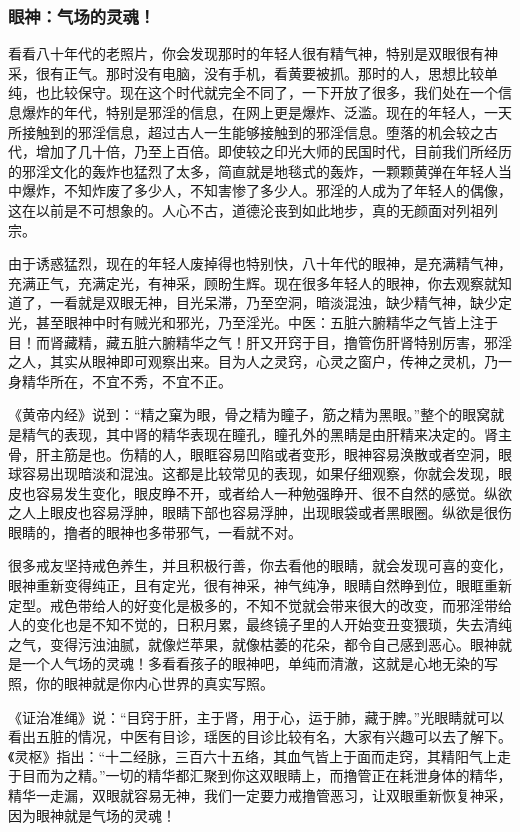 \subsubsection{眼神：气场的灵魂！}

看看八十年代的老照片，你会发现那时的年轻人很有精气神，特别是双眼很有神采，很有正气。那时没有电脑，没有手机，看黄要被抓。那时的人，思想比较单纯，也比较保守。现在这个时代就完全不同了，一下开放了很多，我们处在一个信息爆炸的年代，特别是邪淫的信息，在网上更是爆炸、泛滥。现在的年轻人，一天所接触到的邪淫信息，超过古人一生能够接触到的邪淫信息。堕落的机会较之古代，增加了几十倍，乃至上百倍。即使较之印光大师的民国时代，目前我们所经历的邪淫文化的轰炸也猛烈了太多，简直就是地毯式的轰炸，一颗颗黄弹在年轻人当中爆炸，不知炸废了多少人，不知害惨了多少人。邪淫的人成为了年轻人的偶像，这在以前是不可想象的。人心不古，道德沦丧到如此地步，真的无颜面对列祖列宗。

由于诱惑猛烈，现在的年轻人废掉得也特别快，八十年代的眼神，是充满精气神，充满正气，充满定光，有神采，顾盼生辉。现在很多年轻人的眼神，你去观察就知道了，一看就是双眼无神，目光呆滞，乃至空洞，暗淡混浊，缺少精气神，缺少定光，甚至眼神中时有贼光和邪光，乃至淫光。中医：五脏六腑精华之气皆上注于目！而肾藏精，藏五脏六腑精华之气！肝又开窍于目，撸管伤肝肾特别厉害，邪淫之人，其实从眼神即可观察出来。目为人之灵窍，心灵之窗户，传神之灵机，乃一身精华所在，不宜不秀，不宜不正。

《黄帝内经》说到：“精之窠为眼，骨之精为瞳子，筋之精为黑眼。”整个的眼窝就是精气的表现，其中肾的精华表现在瞳孔，瞳孔外的黑睛是由肝精来决定的。肾主骨，肝主筋是也。伤精的人，眼眶容易凹陷或者变形，眼神容易涣散或者空洞，眼球容易出现暗淡和混浊。这都是比较常见的表现，如果仔细观察，你就会发现，眼皮也容易发生变化，眼皮睁不开，或者给人一种勉强睁开、很不自然的感觉。纵欲之人上眼皮也容易浮肿，眼睛下部也容易浮肿，出现眼袋或者黑眼圈。纵欲是很伤眼睛的，撸者的眼神也多带邪气，一看就不对。

很多戒友坚持戒色养生，并且积极行善，你去看他的眼睛，就会发现可喜的变化，眼神重新变得纯正，且有定光，很有神采，神气纯净，眼睛自然睁到位，眼眶重新定型。戒色带给人的好变化是极多的，不知不觉就会带来很大的改变，而邪淫带给人的变化也是不知不觉的，日积月累，最终镜子里的人开始变丑变猥琐，失去清纯之气，变得污浊油腻，就像烂苹果，就像枯萎的花朵，都令自己感到恶心。眼神就是一个人气场的灵魂！多看看孩子的眼神吧，单纯而清澈，这就是心地无染的写照，你的眼神就是你内心世界的真实写照。

《证治准绳》说：“目窍于肝，主于肾，用于心，运于肺，藏于脾。”光眼睛就可以看出五脏的情况，中医有目诊，瑶医的目诊比较有名，大家有兴趣可以去了解下。《灵枢》指出：“十二经脉，三百六十五络，其血气皆上于面而走窍，其精阳气上走于目而为之精。”一切的精华都汇聚到你这双眼睛上，而撸管正在耗泄身体的精华，精华一走漏，双眼就容易无神，我们一定要力戒撸管恶习，让双眼重新恢复神采，因为眼神就是气场的灵魂！

